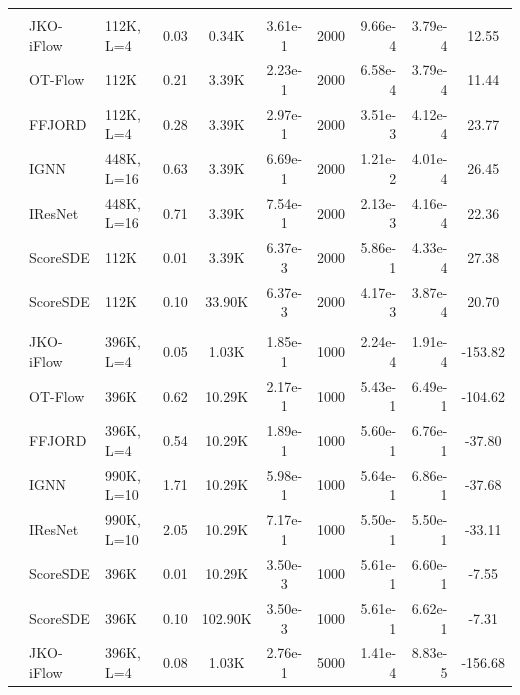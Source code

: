 \documentclass{article}
\theoremstyle{remark}
\theoremstyle{plain}
\newcommand{\JKO}{JKO-iFlow}
\begin{document}
{\begin{table}[!t]
\begin{center}
{\begin{tabular}{lllccccrrc}
     &            \\
  &   \JKO{} & 112K, L=4 & 0.03 & 0.34K & 3.61e-1 & 2000 & 9.66e-4 & 3.79e-4 & 12.55 \\
  &  OT-Flow & 112K & 0.21 & 3.39K & 2.23e-1 & 2000 & 6.58e-4 & 3.79e-4 & 11.44 \\
  &   FFJORD & 112K, L=4 & 0.28 & 3.39K & 2.97e-1 & 2000 & 3.51e-3 & 4.12e-4 & 23.77 \\
  &     IGNN & 448K, L=16 & 0.63 & 3.39K & 6.69e-1 & 2000 & 1.21e-2 & 4.01e-4 & 26.45 \\
  &  IResNet & 448K, L=16 & 0.71 & 3.39K & 7.54e-1 & 2000 & 2.13e-3 & 4.16e-4 & 22.36 \\
  & ScoreSDE & 112K & 0.01 & 3.39K & 6.37e-3 & 2000 & 5.86e-1 & 4.33e-4 & 27.38 \\
  & ScoreSDE & 112K & 0.10 & 33.90K & 6.37e-3 & 2000 & 4.17e-3 & 3.87e-4 & 20.70 \\
    \hline
     &  &  &     &   &     &     & 
     &                 \\
  &   \JKO{} & 396K, L=4 & 0.05 &  1.03K & 1.85e-1 & 1000 & 2.24e-4 & 1.91e-4 & -153.82 \\
  &  OT-Flow & 396K & 0.62 & 10.29K & 2.17e-1 & 1000 & 5.43e-1 & 6.49e-1 & -104.62 \\
  &   FFJORD & 396K, L=4 & 0.54 & 10.29K & 1.89e-1 & 1000 & 5.60e-1 & 6.76e-1 &  -37.80 \\
  &     IGNN & 990K, L=10 & 1.71 & 10.29K & 5.98e-1 & 1000 & 5.64e-1 & 6.86e-1 &  -37.68 \\
  &  IResNet & 990K, L=10 & 2.05 & 10.29K & 7.17e-1 & 1000 & 5.50e-1 & 5.50e-1 &  -33.11 \\
  & ScoreSDE & 396K & 0.01 & 10.29K & 3.50e-3 & 1000 & 5.61e-1 & 6.60e-1 &   -7.55 \\
  & ScoreSDE & 396K & 0.10 & 102.90K & 3.50e-3 & 1000 & 5.61e-1 & 6.62e-1 &   -7.31 \\
 \cmidrule(lr){2-10} 
  &   \JKO{} & 396K, L=4 & 0.08 &  1.03K & 2.76e-1 & 5000 & 1.41e-4 & 8.83e-5 & -156.68 \\
    \hline
\end{tabular}
}
\vspace{-0.015in}
\egroup
\end{center}
\end{table}

}
\end{document}
